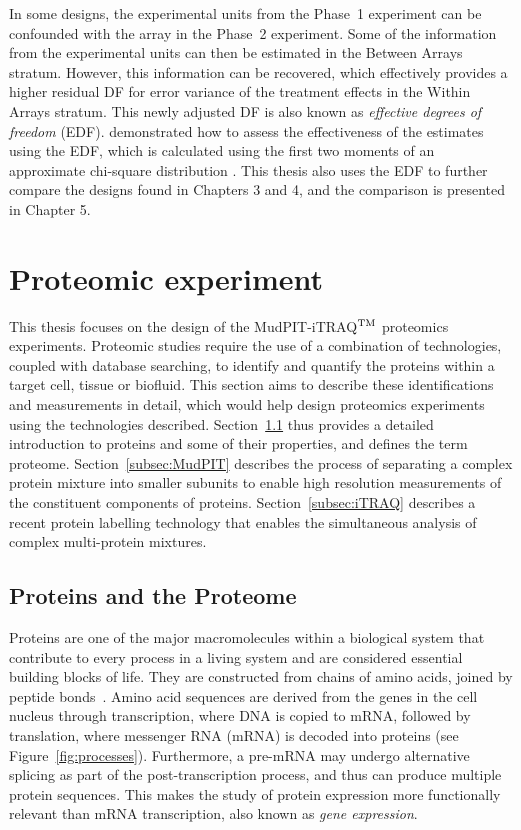 \documentclass[11pt,a4paper]{article}
\begin{document}
In some designs, the experimental units from the Phase~1 experiment can be confounded with the array in the Phase~2 experiment. Some of the information from the experimental units can then be estimated in the Between Arrays stratum. However, this information can be recovered, which effectively provides a higher residual DF for error variance of the treatment effects in the Within Arrays stratum. This newly adjusted DF is also known as \emph{effective degrees of freedom} (EDF). \cite{Jarrett2008} demonstrated how to assess the effectiveness of the estimates using the EDF, which is calculated using the first two moments of an approximate chi-square distribution \citep{Satterthwaite1946}. This thesis also uses the EDF to further compare the designs found in Chapters 3 and 4, and the comparison is presented in Chapter 5. 
 
\section{Proteomic experiment}
\label{sec:proteomicExpt}
This thesis focuses on the design of the MudPIT-iTRAQ$^{\rm TM}$ proteomics experiments. Proteomic studies require the use of a combination of technologies, coupled with database searching, to identify and quantify the proteins within a target cell, tissue or biofluid. This section aims to describe these identifications and measurements in detail, which would help design proteomics experiments using the technologies described. Section~\ref{subsec:protein} thus provides a detailed introduction to proteins and some of their properties, and defines the term proteome. Section~\ref{subsec:MudPIT} describes the process of separating a complex protein mixture into smaller subunits to enable high resolution measurements of the constituent components of proteins. Section~\ref{subsec:iTRAQ} describes a recent protein labelling technology that enables the simultaneous analysis of complex multi-protein mixtures. 

\subsection{Proteins and the Proteome}
\label{subsec:protein}
Proteins are one of the major macromolecules within a biological system that contribute to every process in a living system and are considered essential building blocks of life. They are constructed from chains of amino acids, joined by peptide bonds~\citep{Eidhammer2008}. Amino acid sequences are derived from the genes in the cell nucleus through transcription, where DNA is copied to mRNA, followed by translation, where messenger RNA (mRNA) is decoded into proteins (see Figure~\ref{fig:processes}). Furthermore, a pre-mRNA may undergo alternative splicing as part of the post-transcription process, and thus can produce multiple protein sequences. This makes the study of protein expression more functionally relevant than mRNA transcription, also known as \emph{gene expression}.
\end{document}
